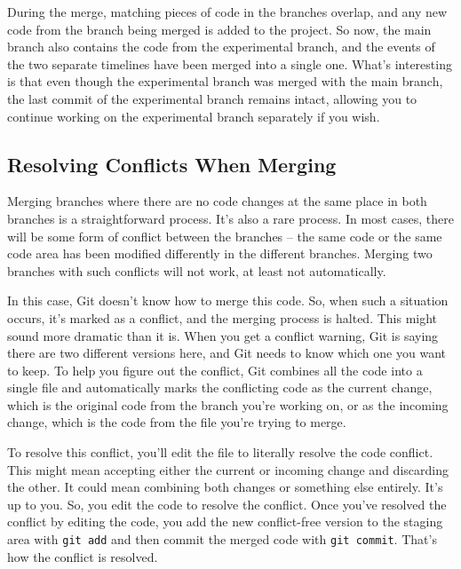 \documentclass[
  letterpaper,
  DIV=11,
  numbers=noendperiod]{scrreprt}
\begin{document}
During the merge, matching pieces of code in the branches overlap, and
any new code from the branch being merged is added to the project. So
now, the main branch also contains the code from the experimental
branch, and the events of the two separate timelines have been merged
into a single one. What's interesting is that even though the
experimental branch was merged with the main branch, the last commit of
the experimental branch remains intact, allowing you to continue working
on the experimental branch separately if you wish.

\hypertarget{resolving-conflicts-when-merging}{%
\subsection{Resolving Conflicts When
Merging}\label{resolving-conflicts-when-merging}}

Merging branches where there are no code changes at the same place in
both branches is a straightforward process. It's also a rare process. In
most cases, there will be some form of conflict between the branches --
the same code or the same code area has been modified differently in the
different branches. Merging two branches with such conflicts will not
work, at least not automatically.

In this case, Git doesn't know how to merge this code. So, when such a
situation occurs, it's marked as a conflict, and the merging process is
halted. This might sound more dramatic than it is. When you get a
conflict warning, Git is saying there are two different versions here,
and Git needs to know which one you want to keep. To help you figure out
the conflict, Git combines all the code into a single file and
automatically marks the conflicting code as the current change, which is
the original code from the branch you're working on, or as the incoming
change, which is the code from the file you're trying to merge.

To resolve this conflict, you'll edit the file to literally resolve the
code conflict. This might mean accepting either the current or incoming
change and discarding the other. It could mean combining both changes or
something else entirely. It's up to you. So, you edit the code to
resolve the conflict. Once you've resolved the conflict by editing the
code, you add the new conflict-free version to the staging area with
\texttt{git\ add} and then commit the merged code with
\texttt{git\ commit}. That's how the conflict is resolved.
\end{document}
